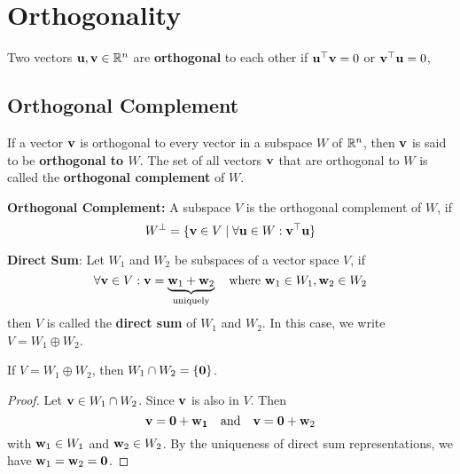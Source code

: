 \section{Orthogonality}
\begin{Def}
    Two vectors $\mathbf{u}, \mathbf{v}\in\mathbb{R}^n$ are \textbf{orthogonal} to each other if $\mathbf{u}^{\top}\mathbf{v} = 0$ or $\mathbf{v}^{\top}\mathbf{u} = 0$,
\end{Def}
\subsection{Orthogonal Complement}

If a vector $\mathbf{v}$ is orthogonal to every vector in a subspace $W$ of $\mathbb{R}^n$, then $\mathbf{v}$ is said to be \textbf{orthogonal to $W$}. The set of all vectors $\mathbf{v}$ that are orthogonal to $W$ is called the \textbf{orthogonal complement} of $W$.

\begin{Def}
    \textbf{Orthogonal Complement: }A subspace $V$ is the orthogonal complement of $W$, if
    \begin{equation*}
        W^\perp = \{\mathbf{v}\in V \mid  \forall \mathbf{u} \in W: \mathbf{v}^{\top}\mathbf{u}  \}
    \end{equation*}
\end{Def}

\begin{Def}
    \textbf{Direct Sum}: Let $W_1$ and $W_2$ be subspaces of a vector space $V$, if 
    \begin{equation*}
        \forall \mathbf{v}\in V: \mathbf{v} = \underbrace{\mathbf{w}_1 + \mathbf{w}_2}_{\text{uniquely}}\quad \text{where } \mathbf{w}_1\in W_1, \mathbf{w}_2 \in W_2
    \end{equation*}
    then $V$ is called the \textbf{direct sum} of $W_1$ and $W_2$. In this case, we write $V = W_1 \oplus W_2$.
\end{Def}
\begin{Thm}
    If $V = W_1\oplus W_2$, then $W_1 \cap W_2 = \{\mathbf{0}\}$.
    \begin{proof}
        Let $\mathbf{v}\in W_1 \cap W_2$. Since $\mathbf{v}$ is also in $V$. Then
        \begin{equation*}
            \mathbf{v} = \mathbf{0} + \mathbf{w_1}\quad \text{and}\quad \mathbf{v} = \mathbf{0} + \mathbf{w}_2
        \end{equation*}
        with $\mathbf{w}_1\in W_1$ and $\mathbf{w}_2 \in W_2$. By the uniqueness of direct sum representations, we have $\mathbf{w}_1 = \mathbf{w}_2 = \mathbf{0}$. 
    \end{proof}
\end{Thm}


